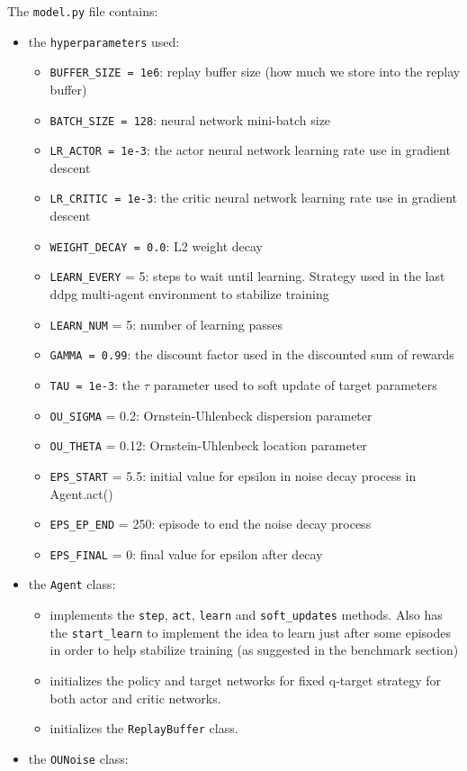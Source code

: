 \documentclass[
]{article}
\providecommand{\tightlist}{%
  \setlength{\itemsep}{0pt}\setlength{\parskip}{0pt}}
\begin{document}
The \texttt{model.py} file contains:

\begin{itemize}
\tightlist
\item
  the \texttt{hyperparameters} used:

  \begin{itemize}
  \tightlist
  \item
    \texttt{BUFFER\_SIZE\ =\ 1e6}: replay buffer size (how much we store
    into the replay buffer)
  \item
    \texttt{BATCH\_SIZE\ =\ 128}: neural network mini-batch size
  \item
    \texttt{LR\_ACTOR\ =\ 1e-3}: the actor neural network learning rate
    use in gradient descent
  \item
    \texttt{LR\_CRITIC\ =\ 1e-3}: the critic neural network learning
    rate use in gradient descent
  \item
    \texttt{WEIGHT\_DECAY\ =\ 0.0}: L2 weight decay
  \item
    \texttt{LEARN\_EVERY} = 5: steps to wait until learning. Strategy
    used in the last ddpg multi-agent environment to stabilize training
  \item
    \texttt{LEARN\_NUM} = 5: number of learning passes
  \item
    \texttt{GAMMA\ =\ 0.99}: the discount factor used in the discounted
    sum of rewards
  \item
    \texttt{TAU\ =\ 1e-3}: the \(\tau\) parameter used to soft update of
    target parameters
  \item
    \texttt{OU\_SIGMA} = 0.2: Ornstein-Uhlenbeck dispersion parameter
  \item
    \texttt{OU\_THETA} = 0.12: Ornstein-Uhlenbeck location parameter
  \item
    \texttt{EPS\_START} = 5.5: initial value for epsilon in noise decay
    process in Agent.act()
  \item
    \texttt{EPS\_EP\_END} = 250: episode to end the noise decay process
  \item
    \texttt{EPS\_FINAL} = 0: final value for epsilon after decay
  \end{itemize}
\item
  the \texttt{Agent} class:

  \begin{itemize}
  \tightlist
  \item
    implements the \texttt{step}, \texttt{act}, \texttt{learn} and
    \texttt{soft\_updates} methods. Also has the \texttt{start\_learn}
    to implement the idea to learn just after some episodes in order to
    help stabilize training (as suggested in the benchmark section)
  \item
    initializes the policy and target networks for fixed q-target
    strategy for both actor and critic networks.
  \item
    initializes the \texttt{ReplayBuffer} class.
  \end{itemize}
\item
  the \texttt{OUNoise} class:


\end{itemize}
\end{document}
